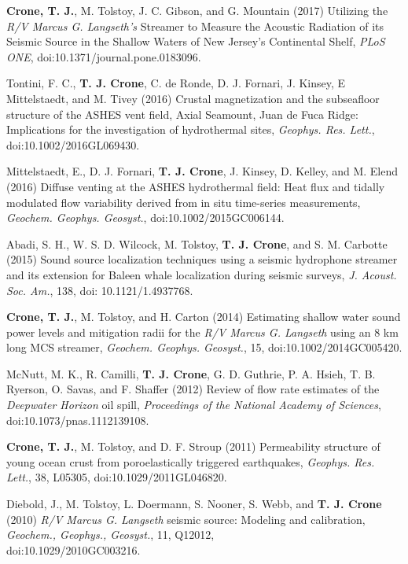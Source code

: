 \documentclass[11pt]{res}
\begin{document}
\begin{resume}
{\bf Crone, T. J.}, M. Tolstoy, J. C. Gibson, and G. Mountain (2017)
Utilizing the \textit{R/V Marcus G. Langseth's} Streamer to Measure the Acoustic Radiation of its Seismic Source in the Shallow Waters of New Jersey's Continental Shelf, \textit{PLoS ONE}, doi:10.1371/journal.pone.0183096.

Tontini, F. C., {\bf T. J. Crone}, C. de Ronde, D. J. Fornari, J. Kinsey, E Mittelstaedt,  and M. Tivey (2016) Crustal magnetization and the subseafloor structure of the ASHES vent field, Axial Seamount, Juan de Fuca Ridge: Implications for the investigation of hydrothermal sites, {\em Geophys. Res. Lett.}, doi:10.1002/2016GL069430.

Mittelstaedt, E., D. J. Fornari, {\bf T. J. Crone}, J. Kinsey, D. Kelley, and M. Elend (2016) Diffuse venting at the ASHES hydrothermal field: Heat flux and tidally modulated flow variability derived from in situ time-series measurements, {\em Geochem. Geophys. Geosyst.}, \linebreak doi:10.1002/2015GC006144.

Abadi, S. H., W. S. D. Wilcock, M. Tolstoy, {\bf T. J. Crone}, and S. M. Carbotte (2015) Sound source localization techniques using a seismic hydrophone streamer and its extension for Baleen whale localization during seismic surveys, {\em J. Acoust. Soc. Am.}, 138, doi: 10.1121/1.4937768.

{\bf Crone, T. J.}, M. Tolstoy, and H. Carton (2014) Estimating shallow water sound power levels and mitigation radii for the {\em R/V Marcus G. Langseth} using an 8 km long MCS streamer, {\em Geochem. Geophys. Geosyst.}, 15, doi:10.1002/2014GC005420.

McNutt, M. K., R. Camilli, {\bf T. J. Crone}, G. D. Guthrie, P. A. Hsieh, T. B. Ryerson, O. Savas, and F. Shaffer (2012) Review of flow rate estimates of the {\em Deepwater Horizon} oil spill, {\em Proceedings of the National Academy of Sciences}, doi:10.1073/pnas.1112139108.

{\bf Crone, T. J.}, M. Tolstoy, and D. F. Stroup (2011) Permeability structure of young ocean crust from poroelastically triggered earthquakes, {\em Geophys. Res. Lett.}, 38, L05305, doi:10.1029/2011GL046820.

Diebold, J., M. Tolstoy, L. Doermann, S. Nooner, S. Webb, and {\bf T. J. Crone} (2010) {\em R/V Marcus G. Langseth} seismic source: Modeling and calibration, {\em Geochem., Geophys., Geosyst.}, 11, Q12012,\\doi:10.1029/2010GC003216.


\end{resume}
\end{document}
